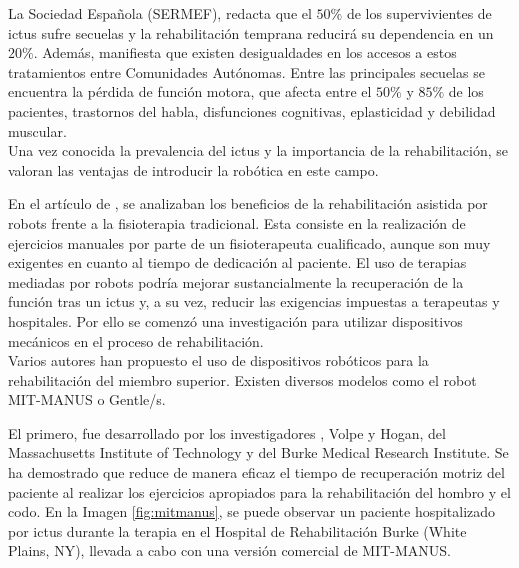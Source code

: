 La Sociedad Española \cite{cita5} (SERMEF), redacta que el $50\%$ de los supervivientes de ictus sufre secuelas y la rehabilitación temprana reducirá su dependencia en un $20\%$.
Además, manifiesta que existen desigualdades en los accesos a estos tratamientos entre Comunidades Autónomas.
Entre las principales secuelas se encuentra la pérdida de función motora, que afecta entre el $50\%$ y $85\%$ de los pacientes, trastornos del habla, disfunciones cognitivas, eplasticidad y debilidad muscular.\\

Una vez conocida la prevalencia del ictus y la importancia de la rehabilitación, se valoran las ventajas de introducir la robótica en este campo.

En el artículo de \cite{perales3a}, se analizaban los beneficios de la rehabilitación asistida por robots frente a la fisioterapia tradicional.
Esta consiste en la realización de ejercicios manuales por parte de un fisioterapeuta cualificado, aunque son muy exigentes en cuanto al tiempo de dedicación al paciente.
El uso de terapias mediadas por robots podría mejorar sustancialmente la recuperación de la función tras un ictus y, a su vez, reducir las exigencias impuestas a terapeutas y hospitales.
Por ello se comenzó una investigación para utilizar dispositivos mecánicos en el proceso de rehabilitación.\\

Varios autores han propuesto el uso de dispositivos robóticos para la rehabilitación del miembro superior.
Existen diversos modelos como el robot MIT-MANUS o Gentle/s.

El primero, fue desarrollado por los investigadores \cite{perales3b}, Volpe y Hogan, del Massachusetts Institute of Technology y del Burke Medical Research Institute.
Se ha demostrado que reduce de manera eficaz el tiempo de recuperación motriz del paciente al realizar los ejercicios apropiados para la rehabilitación del hombro y el codo.
En la Imagen \ref{fig:mitmanus}, se puede observar un paciente hospitalizado por ictus durante la terapia en el Hospital de Rehabilitación Burke (White Plains, NY), llevada a cabo con una versión comercial de MIT-MANUS.

